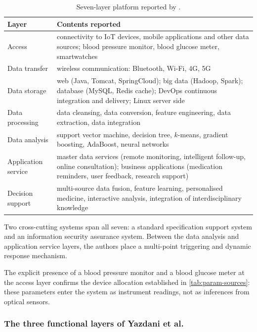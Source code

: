 \documentclass[12pt,a4paper,oneside]{report}
\begin{document}
\begin{table}[htbp]
\centering\footnotesize
\caption{Seven-layer platform reported by \textcite{liu2025review}.}\label{tab:liu-layers}
\begin{tabularx}{\textwidth}{@{}>{\raggedright\arraybackslash}p{2.8cm} X@{}}
\toprule
\textbf{Layer} & \textbf{Contents reported} \\
\midrule
Access & connectivity to IoT devices, mobile applications and other data sources; blood pressure monitor, blood glucose meter, smartwatches \\
Data transfer & wireless communication: Bluetooth, Wi-Fi, 4G, 5G \\
Data storage & web (Java, Tomcat, SpringCloud); big data (Hadoop, Spark); database (MySQL, Redis cache); DevOps continuous integration and delivery; Linux server side \\
Data processing & data cleansing, data conversion, feature engineering, data extraction, data integration \\
Data analysis & support vector machine, decision tree, $k$-means, gradient boosting, AdaBoost, neural networks \\
Application service & master data services (remote monitoring, intelligent follow-up, online consultation); business applications (medication reminders, user feedback, research support) \\
Decision support & multi-source data fusion, feature learning, personalised medicine, interactive analysis, integration of interdisciplinary knowledge \\
\bottomrule
\end{tabularx}
\end{table}

Two cross-cutting systems span all seven: a standard specification support system and an information security assurance system. Between the data analysis and application service layers, the authors place a multi-point triggering and dynamic response mechanism.

The explicit presence of a blood pressure monitor and a blood glucose meter at the access layer confirms the device allocation established in \cref{tab:param-sources}: these parameters enter the system as instrument readings, not as inferences from optical sensors.

\subsubsection{The three functional layers of Yazdani et al.}
\end{document}
